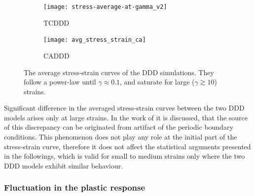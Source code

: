 \begin{figure}[htbp!] 
  \centering
  \begin{subfigure}[b]{0.48\textwidth}
    \texttt{[image: stress-average-at-gamma\_v2]}
    \caption{TCDDD}
    \label{fig:weakest_avg_stress_strain_TCDDD}   
  \end{subfigure}          
  \begin{subfigure}[b]{0.48\textwidth}
    \texttt{[image: avg\_stress\_strain\_ca]}
    \caption{CADDD}
    \label{fig:weakest_avg_stress_strain_CADDD}   
  \end{subfigure}             
  \caption[Analysis of the stress sequence for DDDs]{The average stress-strain curves of the DDD simulations. They follow a power-law until $\gamma \approx 0.1$, and saturate for large ($\gamma \gtrsim 10$) strains.}
  \label{fig:weakest_avg_stress_strain_DDD}
\end{figure}


Significant difference in the averaged stress-strain curves between the two DDD models arises only at large strains. In the work of \citet{1742-5468-2015-8-P08009} it is discussed, that the source of this discrepancy can be originated from artifact of the periodic boundary conditions. This phenomenon does not play any role at the initial part of the stress-strain curve, therefore it does not affect the statistical arguments presented in the followings, which is valid for small to medium strains only where the two DDD models exhibit similar behaviour.




\subsubsection{Fluctuation in the plastic response}

